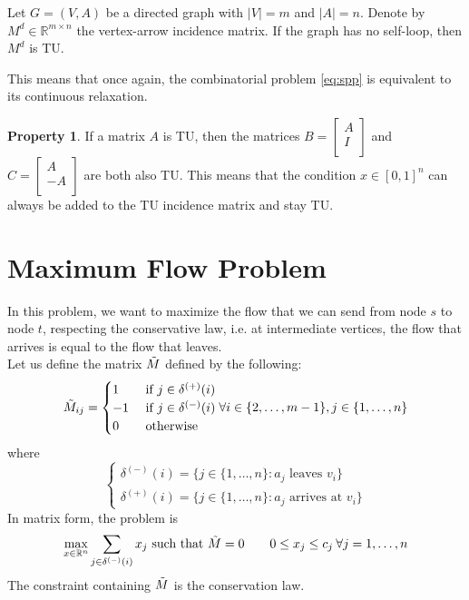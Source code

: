 \documentclass[12pt, openany]{report}
\newcommand{\R}{\mathbb{R}}
\theoremstyle{definition}
\newtheorem{prop}[thm]{Property}
\begin{document}
\begin{tcolorbox}[breakable,
    colback=white,
    colframe=white!75!black,
    title={Theorem}]
    Let \(G=(V,A)\) be a directed graph with \(|V|=m\) and \(|A|=n\). Denote by \(M^d\in\R^{m\times n}\) the vertex-arrow incidence matrix. If the graph has no self-loop, then \(M^d\) is TU.
\end{tcolorbox}
This means that once again, the combinatorial problem \eqref{eq:spp} is equivalent to its continuous relaxation. 
\begin{prop}
    If a matrix \(A\) is TU, then the matrices \(B=\begin{bmatrix}
        A \\
        I \\
    \end{bmatrix}\) and \(C=\begin{bmatrix}
        A\\ -A\\
    \end{bmatrix}\) are both also TU. This means that the condition \(x\in [0,1]^n\) can always be added to the TU incidence matrix and stay TU.
\end{prop}
\section{Maximum Flow Problem}
In this problem, we want to maximize the flow that we can send from node \(s\) to node \(t\), respecting the conservative law, i.e. at intermediate vertices, the flow that arrives is equal to the flow that leaves. \\
Let us define the matrix \(\Tilde M\) defined by the following:
\begin{equation}
    \Tilde M_{ij} = \begin{cases}
        1 & \text{ if } j\in \delta^{(+)}(i)\\
        -1 & \text{ if } j\in \delta^{(-)}(i)\\
        0 & \text{ otherwise}\\
    \end{cases} \forall i\in \{2,\dots,m-1\},j\in \{1,\dots, n\}
\end{equation}
where 
\begin{equation}
    \begin{cases}
        \delta^{(-)}(i) = \{j\in \{1,\dots,n\}:a_j\text{ leaves }v_i\}\\
        \delta^{(+)}(i) = \{j\in \{1,\dots,n\}:a_j\text{ arrives at }v_i\}
    \end{cases}
\end{equation}
In matrix form, the problem is
\begin{equation}
    \max_{x\in \R^n} \sum_{j\in \delta^{(-)}(i)}x_j \text{   such that   } \Tilde M=0\qquad 0\le x_j\le c_j \: \forall j=1,\dots,n
\end{equation}
The constraint containing \(\Tilde M\) is the conservation law. 
\end{document}
